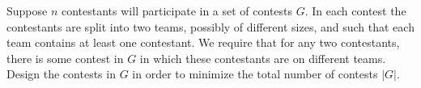 \problem{}
Suppose $n$ contestants will participate in a set of contests $G$.  In each contest the contestants are split into two teams, possibly of different sizes, and such that each team contains at least one contestant.  We require that for any two contestants, there is some contest in $G$ in which these contestants are on different teams.  Design the contests in $G$ in order to minimize the total number of contests $|G|$.

\solution{

}

\newpage